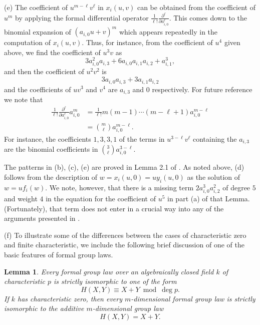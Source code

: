 \documentclass[12pt]{amsart}
\theoremstyle{theorem}
\newtheorem{lem}{Lemma}
\begin{document}
\vskip 10pt
\noindent
(e)  The coefficient of $u^{m - \ell} v^\ell$ in $x_i(u,v)$ can be obtained from the coefficient of $u^m$ by applying the
formal differential operator $\frac{1}{\ell!} \frac{\partial^\ell}{\partial a_{i,0}^\ell}$.   This comes down to the binomial
expansion of $(a_{i,0} u + v)^m$ which appears repeatedly in the computation of $x_i(u,v)$. Thus, for instance, from 
the coefficient of $u^4$ given above, we find the coefficient of $u^3 v$ as 
$$3 a_{i,0}^2 a_{i,3} + 6 a_{i,0} a_{i,1} a_{i,2} + a_{i,1}^3,$$
and then the coefficient of $u^2 v^2$ is
$$3 a_{i,0} a_{i,3} + 3 a_{i,1} a_{i,2}$$
and the coefficients of $u v^3$ and $v^4$ are $a_{i,3}$ and $0$ respectively.   For future reference we note that
\begin{align}
\label{BCE}
\frac{1}{\ell!} \frac{\partial^\ell}{\partial a_{i,0}^\ell} a_{i,0}^m &= \frac{1}{\ell!} m(m-1) \cdots (m-\ell + 1) a_{i,0}^{m-\ell} \nonumber \\
 &= \binom{m}{\ell} a_{i,0}^{m - \ell}.
\end{align}
For instance, the coefficients $1,3,3,1$ of the terms in $u^{3-\ell} v^\ell$ containing the $a_{i,3}$ are the binomial coefficients in 
 $\binom{3}{\ell} a_{i,0}^{3-\ell}$.

\vskip 10pt
\noindent
The patterns in (b), (c), (e) are proved in Lemma 2.1 of \cite{Lit}.  As noted above, (d) follows from the description of 
$w = x_i(u,0) = u y_i(u,0)$ as the solution of $w = u f_i(w)$.  We note, however, that there is a 
missing term $2 a_{i,0}^3 a_{i,2}^2$ of degree $5$ and weight $4$ in the equation for the coefficient of $u^5$ in part (a) of that Lemma.  
(Fortunately), that term does not enter in a crucial way into any of the arguments presented in \cite{Lit}.

\vskip 10pt
\noindent
(f)  To illustrate some of the differences between the cases of characteristic zero and finite characteristic, we include
the following brief discussion of one of the basic features of formal group laws.

\begin{lem}
\label{FGNF1}
 Every formal group law over an algebraically closed field $k$ of characteristic $p$ is strictly isomorphic to one of the form
$$H(X,Y) \equiv X + Y \bmod \deg p.$$
If $k$ has characteristic zero, then every $m$-dimensional formal group law is strictly isomorphic to the additive $m$-dimensional 
group law
$$H(X,Y) = X + Y.$$
\end{lem}
\end{document}
